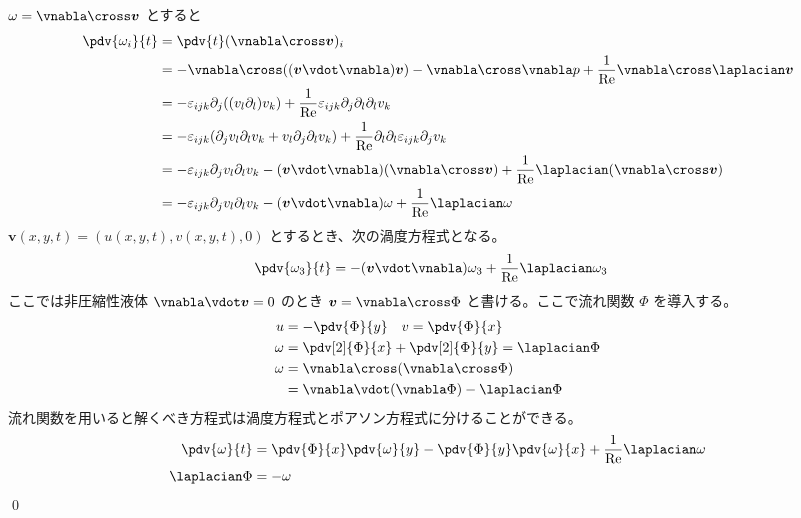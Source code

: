 \documentclass[uplatex,dvipdfmx,a4paper,11pt]{jlreq}
\makeatletter
\theoremstyle{definition}
\renewenvironment{proof}[1][\proofname]{\par
  \normalfont
  \topsep6\p@\@plus6\p@ \trivlist
  \item[\hskip\labelsep{\bfseries #1}\@addpunct{\bfseries}]\ignorespaces\quad\par
}{%
  \qed\endtrivlist\@endpefalse
}
\renewcommand\proofname{証明}
\makeatother
\begin{document}
\begin{proof}
  $\omega = \vnabla\cross\bm{v}$ とすると
  \begin{align}
    \pdv{\omega_i}{t} & = \pdv{t}(\vnabla\cross\bm{v})_i                                                                                                                        \\
                      & = -\vnabla\cross((\bm{v}\vdot\vnabla)\bm{v}) - \vnabla\cross\vnabla p + \frac{1}{\mathrm{Re}}\vnabla\cross\laplacian\bm{v}                              \\
                      & = -\varepsilon_{ijk}\partial_j((v_l\partial_l)v_k) + \frac{1}{\mathrm{Re}}\varepsilon_{ijk}\partial_j\partial_l\partial_lv_k                            \\
                      & = -\varepsilon_{ijk}(\partial_jv_l\partial_lv_k + v_l\partial_j\partial_lv_k) + \frac{1}{\mathrm{Re}}\partial_l\partial_l\varepsilon_{ijk}\partial_jv_k \\
                      & = -\varepsilon_{ijk}\partial_jv_l\partial_lv_k - (\bm{v}\vdot\vnabla)(\vnabla\cross\bm{v}) + \frac{1}{\mathrm{Re}}\laplacian(\vnabla\cross\bm{v})       \\
                      & = -\varepsilon_{ijk}\partial_jv_l\partial_lv_k - (\bm{v}\vdot\vnabla)\omega + \frac{1}{\mathrm{Re}}\laplacian\omega
  \end{align}
  $\bm{v}(x, y, t) = (u(x, y, t), v(x, y, t), 0)$ とするとき、次の渦度方程式となる。
  \begin{align}
    \pdv{\omega_3}{t} & = - (\bm{v}\vdot\vnabla)\omega_3 + \frac{1}{\mathrm{Re}}\laplacian\omega_3
  \end{align}
  ここでは非圧縮性液体 $\vnabla\vdot\bm{v} = 0$ のとき $\bm{v} = \vnabla\cross\Phi$ と書ける。ここで流れ関数 $\Phi$ を導入する。
  \begin{align}
    u      & = - \pdv{\Phi}{y} \quad v = \pdv{\Phi}{x}              \\
    \omega & = \pdv[2]{\Phi}{x} + \pdv[2]{\Phi}{y} = \laplacian\Phi \\
    \omega & = \vnabla\cross(\vnabla\cross\Phi)                     \\
           & = \vnabla\vdot(\vnabla\Phi) - \laplacian\Phi
  \end{align}
  流れ関数を用いると解くべき方程式は渦度方程式とポアソン方程式に分けることができる。
  \begin{align}
    \pdv{\omega}{t} & = \pdv{\Phi}{x}\pdv{\omega}{y} - \pdv{\Phi}{y}\pdv{\omega}{x} + \frac{1}{\mathrm{Re}}\laplacian\omega \\
    \laplacian\Phi  & = - \omega
  \end{align}
\end{proof}
\end{document}
